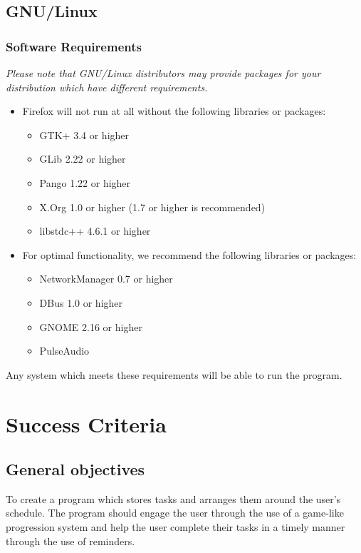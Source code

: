 \documentclass{article}
\begin{document}
\subsection*{GNU/Linux}\label{gnulinux}

\subsubsection*{Software Requirements}\label{software-requirements}

\emph{Please note that GNU/Linux distributors may provide packages for your
	distribution which have different requirements.}

\begin{itemize}
	\item Firefox will not run at all without the following libraries or packages:

	      \begin{itemize}
		      \item GTK+ 3.4 or higher
		      \item GLib 2.22 or higher
		      \item Pango 1.22 or higher
		      \item X.Org 1.0 or higher (1.7 or higher is recommended)
		      \item libstdc++ 4.6.1 or higher
	      \end{itemize}
	\item For optimal functionality, we recommend the following libraries or
	      packages:

	      \begin{itemize}
		      \item NetworkManager 0.7 or higher \index{\item}\index{\item}\item DBus 1.0 or
		            higher
		      \item GNOME 2.16 or higher
		      \item PulseAudio
	      \end{itemize}
\end{itemize}

Any system which meets these requirements will be able to run the program.

\section{Success Criteria}

\subsection{General objectives}
To create a program which stores tasks and arranges them around the user's
schedule. The program should engage the user through the use of a game-like
progression system and help the user complete their tasks in a timely manner
through the use of reminders.
\end{document}
